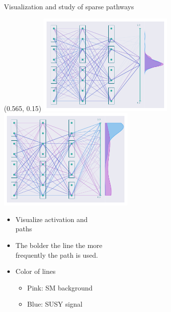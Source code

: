 \documentclass[UKenglish]{beamer}
\begin{document}
\begin{frame}{Visualization and study of sparse pathways}
    \begin{textblock}{0.8}(0.565, 0.15)
        \includegraphics[width = 0.5\textwidth]{figures/NetworkVis/BeforeTraining.pdf}
        \includegraphics[width = 0.5\textwidth]{figures/NetworkVis/AfterTraining.pdf}
    \end{textblock}
    \begin{itemize}
        \item Visualize activation and \\
        paths
        \item The bolder the line the more\\ 
        frequently the path is used.
        \item Color of lines 
        \begin{itemize}
            \item Pink: SM background
            \item Blue: SUSY signal
        \end{itemize}
    \end{itemize}
\end{frame}
\end{document}
